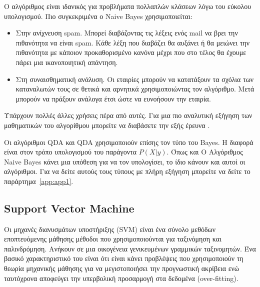 Ο αλγόριθμος είναι ιδανικός για προβλήματα πολλαπλών κλάσεων λόγω του εύκολου υπολογισμού.
Πιο συγκεκριμένα ο \textlatin{Naive Bayes} χρησιμοποιείται:
\begin{itemize}
    \item Στην ανίχνευση \textlatin{spam}. Μπορεί διαβάζοντας τις λέξεις ενός
    \textlatin{mail} να βρει την πιθανότητα να είναι \textlatin{spam}. Κάθε λέξη που διαβάζει
    θα αυξάνει ή θα μειώνει την πιθανότητα με κάποιον προκαθορισμένο κανόνα μέχρι που στο
    τέλος θα έχουμε πάρει μια ικανοποιητική απάντηση.
    \item Στη συναισθηματική ανάλυση. Οι εταιρίες μπορούν να κατατάξουν τα σχόλια των
    καταναλωτών τους σε θετικά και αρνητικά χρησιμοποιώντας τον αλγόριθμο. Μετά μπορούν
    να πράξουν ανάλογα έτσι ώστε να ευνοήσουν την εταιρία.
\end{itemize}

Υπάρχουν πολλές άλλες χρήσεις πέρα από αυτές. Για μια πιο αναλυτική εξήγηση των μαθηματικών
του αλγορίθμου μπορείτε να διαβάσετε την εξής έρευνα \cite{rish2001empirical}.

Οι αλγόριθμοι \textlatin{QDA} και \textlatin{QDA} χρησιμοποιούν επίσης τον τύπο του
\textlatin{Bayes}. Η διαφορά είναι στον τρόπο υπολογισμού του παράγοντα $P(X|y)$. Όπως και Ο
Αλγόριθμος \textlatin{Naive Bayes} κάνει μια υπόθεση για να τον υπολογίσει, το ίδιο κάνουν και
αυτοί οι αλγόριθμοι. Για να δείτε αυτούς τους τύπους με πλήρη εξήγηση μπορείτε να δείτε το
παράρτημα~\ref{app:app1}.

\subsection{\textlatin{Support Vector Machine}}
Οι μηχανές διανυσμάτων υποστήριξης (\textlatin{SVM}) είναι ένα σύνολο μεθόδων εποπτευόμενης
μάθησης
μέθοδοι που χρησιμοποιούνται για ταξινόμηση και παλινδρόμηση. Ανήκουν σε μια οικογένεια
γενικευμένων γραμμικών ταξινομητών. Ένα βασικό χαρακτηριστικό του είναι ότι είναι κάνει
προβλέψεις που χρησιμοποιούν τη θεωρία μηχανικής μάθησης για να μεγιστοποιήσει την
προγνωστική ακρίβεια ενώ ταυτόχρονα αποφεύγει την υπερβολική προσαρμογή στα δεδομένα
(\textlatin{over-fitting})\cite{jakkula2006tutorial}.


